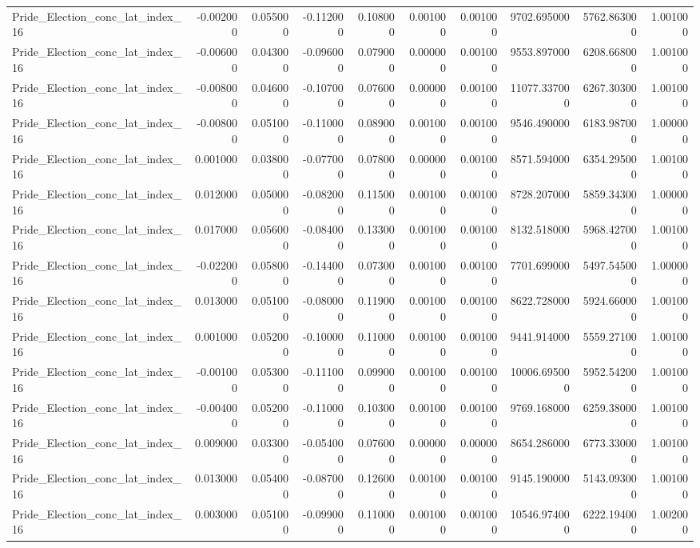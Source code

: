 \begin{table}
\begin{tabular}{lrrrrrrrrr}
Pride_Election_conc_lat_index_16 & -0.002000 & 0.055000 & -0.112000 & 0.108000 & 0.001000 & 0.001000 & 9702.695000 & 5762.863000 & 1.001000 \\
Pride_Election_conc_lat_index_16 & -0.006000 & 0.043000 & -0.096000 & 0.079000 & 0.000000 & 0.001000 & 9553.897000 & 6208.668000 & 1.001000 \\
Pride_Election_conc_lat_index_16 & -0.008000 & 0.046000 & -0.107000 & 0.076000 & 0.000000 & 0.001000 & 11077.337000 & 6267.303000 & 1.001000 \\
Pride_Election_conc_lat_index_16 & -0.008000 & 0.051000 & -0.110000 & 0.089000 & 0.001000 & 0.001000 & 9546.490000 & 6183.987000 & 1.000000 \\
Pride_Election_conc_lat_index_16 & 0.001000 & 0.038000 & -0.077000 & 0.078000 & 0.000000 & 0.001000 & 8571.594000 & 6354.295000 & 1.001000 \\
Pride_Election_conc_lat_index_16 & 0.012000 & 0.050000 & -0.082000 & 0.115000 & 0.001000 & 0.001000 & 8728.207000 & 5859.343000 & 1.000000 \\
Pride_Election_conc_lat_index_16 & 0.017000 & 0.056000 & -0.084000 & 0.133000 & 0.001000 & 0.001000 & 8132.518000 & 5968.427000 & 1.001000 \\
Pride_Election_conc_lat_index_16 & -0.022000 & 0.058000 & -0.144000 & 0.073000 & 0.001000 & 0.001000 & 7701.699000 & 5497.545000 & 1.000000 \\
Pride_Election_conc_lat_index_16 & 0.013000 & 0.051000 & -0.080000 & 0.119000 & 0.001000 & 0.001000 & 8622.728000 & 5924.660000 & 1.001000 \\
Pride_Election_conc_lat_index_16 & 0.001000 & 0.052000 & -0.100000 & 0.110000 & 0.001000 & 0.001000 & 9441.914000 & 5559.271000 & 1.001000 \\
Pride_Election_conc_lat_index_16 & -0.001000 & 0.053000 & -0.111000 & 0.099000 & 0.001000 & 0.001000 & 10006.695000 & 5952.542000 & 1.001000 \\
Pride_Election_conc_lat_index_16 & -0.004000 & 0.052000 & -0.110000 & 0.103000 & 0.001000 & 0.001000 & 9769.168000 & 6259.380000 & 1.001000 \\
Pride_Election_conc_lat_index_16 & 0.009000 & 0.033000 & -0.054000 & 0.076000 & 0.000000 & 0.000000 & 8654.286000 & 6773.330000 & 1.001000 \\
Pride_Election_conc_lat_index_16 & 0.013000 & 0.054000 & -0.087000 & 0.126000 & 0.001000 & 0.001000 & 9145.190000 & 5143.093000 & 1.001000 \\
Pride_Election_conc_lat_index_16 & 0.003000 & 0.051000 & -0.099000 & 0.110000 & 0.001000 & 0.001000 & 10546.974000 & 6222.194000 & 1.002000 \\

\end{tabular}
\end{table}
